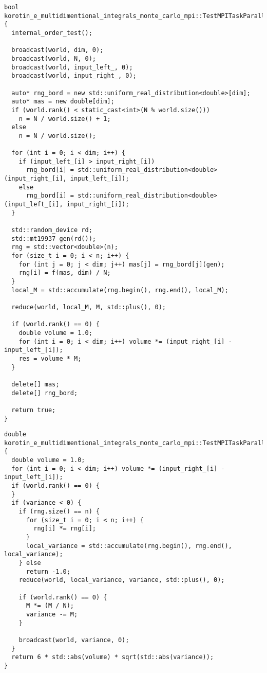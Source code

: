 \documentclass[a4paper,12pt]{article}
\begin{document}
\begin{lstlisting}[caption={run параллельной (MPI) версии}, label=lst:mpi_code]
bool korotin_e_multidimentional_integrals_monte_carlo_mpi::TestMPITaskParallel::run() {
  internal_order_test();

  broadcast(world, dim, 0);
  broadcast(world, N, 0);
  broadcast(world, input_left_, 0);
  broadcast(world, input_right_, 0);

  auto* rng_bord = new std::uniform_real_distribution<double>[dim];
  auto* mas = new double[dim];
  if (world.rank() < static_cast<int>(N % world.size()))
    n = N / world.size() + 1;
  else
    n = N / world.size();

  for (int i = 0; i < dim; i++) {
    if (input_left_[i] > input_right_[i])
      rng_bord[i] = std::uniform_real_distribution<double>(input_right_[i], input_left_[i]);
    else
      rng_bord[i] = std::uniform_real_distribution<double>(input_left_[i], input_right_[i]);
  }

  std::random_device rd;
  std::mt19937 gen(rd());
  rng = std::vector<double>(n);
  for (size_t i = 0; i < n; i++) {
    for (int j = 0; j < dim; j++) mas[j] = rng_bord[j](gen);
    rng[i] = f(mas, dim) / N;
  }
  local_M = std::accumulate(rng.begin(), rng.end(), local_M);

  reduce(world, local_M, M, std::plus(), 0);

  if (world.rank() == 0) {
    double volume = 1.0;
    for (int i = 0; i < dim; i++) volume *= (input_right_[i] - input_left_[i]);
    res = volume * M;
  }

  delete[] mas;
  delete[] rng_bord;

  return true;
}
\end{lstlisting}

\begin{lstlisting}[caption={Првоерка корректности параллельной (MPI) версии}, label=lst:mpi_code]
double korotin_e_multidimentional_integrals_monte_carlo_mpi::TestMPITaskParallel::possible_error() {
  double volume = 1.0;
  for (int i = 0; i < dim; i++) volume *= (input_right_[i] - input_left_[i]);
  if (world.rank() == 0) {
  }
  if (variance < 0) {
    if (rng.size() == n) {
      for (size_t i = 0; i < n; i++) {
        rng[i] *= rng[i];
      }
      local_variance = std::accumulate(rng.begin(), rng.end(), local_variance);
    } else
      return -1.0;
    reduce(world, local_variance, variance, std::plus(), 0);

    if (world.rank() == 0) {
      M *= (M / N);
      variance -= M;
    }

    broadcast(world, variance, 0);
  }
  return 6 * std::abs(volume) * sqrt(std::abs(variance));
}
\end{lstlisting}
\end{document}

